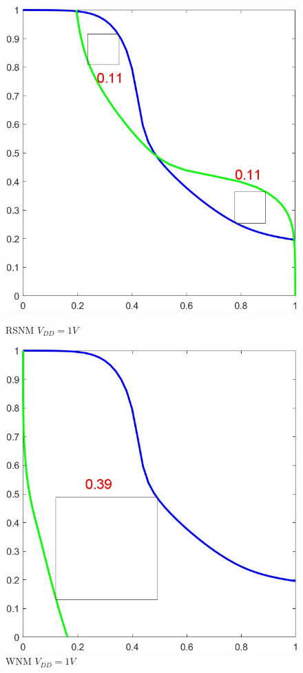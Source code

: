 \documentclass{article}
\begin{document}
\begin{figure}[H]
\centering
\begin{minipage}[t]{0.28\textwidth}
\centering
    \includegraphics[width=\textwidth]{./img/2023-11-12-01-09-21.png}
\caption{RSNM $V_{DD} = 1V$}
\label{rsnm1}
\end{minipage}
\qquad
\begin{minipage}[t]{0.28\textwidth}
\centering
    \includegraphics[width=\textwidth]{./img/2023-11-12-01-10-19.png}
\caption{WNM $V_{DD} = 1V$}
\label{wnm1}
\end{minipage}
\end{figure}
\end{document}
